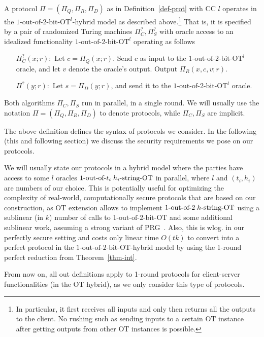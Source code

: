 \documentclass[a4paper]{article}
\newcommand{\OT}[2]{#1\text{-out-of-}#2\text{-bit-OT}}
\newcommand{\sOT}[3]{#1\text{-out-of-}#2\text{\;$#3$-string-OT}}
\begin{document}


A protocol $\Pi=(\Pi_Q,\Pi_R,\Pi_D)$ as in Definition~\ref{def-prot} with CC $l$ operates in the ${\OT{1}{2}}^l$-hybrid model as described above.\footnote{In particular, it first receives all inputs and only then returns all the outputs to the client. No rushing such as sending inputs to a certain OT instance after getting outputs from other OT instances is possible.}
That is, it is specified by a pair of randomized Turing machines $\Pi^?_C,\Pi^?_S$ with oracle access to an idealized functionality ${\OT{1}{2}}^l$ operating as follows
\begin{enumerate}
	\item[$\Pi^?_C(x;r):$] 
	Let $c=\Pi_Q(x;r)$. Send $c$ as input to the ${\OT{1}{2}}^l$ oracle, and let $v$ denote the oracle's output. Output $\Pi_R(x,c,v;r)$.
	\item[$\Pi^?(y;r):$] Let $s=\Pi_D(y;r)$, and send it to the 
	${\OT{1}{2}}^l$ oracle.  
\end{enumerate}
Both algorithms $\Pi_C,\Pi_S$ run in parallel, in a single round.
We will usually use the notation $\Pi=(\Pi_Q,\Pi_R,\Pi_D)$ to denote protocols, while $\Pi_C,\Pi_S$ are implicit.

The above definition defines the syntax of protocols we consider. In the following (this and following section) we discuss the security requirements we pose on our protocols.

We will usually state our protocols in a hybrid model where the parties have access to some $l$ oracles $\sOT{1}{t_i}{h_i}$ in parallel, where $l$ and $(t_i,h_i)$ are numbers of our choice. 
This is potentially useful for optimizing the complexity of real-world, computationally secure protocols that are based on our construction, as OT extension allows to implement $\sOT{1}{2}{h}$ using a sublinear (in $k$) number of calls to $\OT{1}{2}$ and some additional sublinear work, assuming a strong variant of PRG~\cite{IKOS08}. 
Also, this is wlog. in our perfectly secure setting and costs only linear time $O(tk)$ to convert into a perfect protocol in the $\OT{1}{2}$-hybrid model by using the 1-round perfect reduction from Theorem~\ref{thm-int}.

From now on, all out definitions apply to 1-round protocols for client-server functionalities (in the OT hybrid), as we only consider this type of protocols. 
\end{document}
